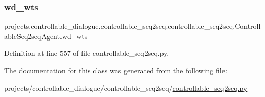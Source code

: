 \subsubsection{\texorpdfstring{wd\+\_\+wts}{wd\_wts}}
{\footnotesize\ttfamily projects.\+controllable\+\_\+dialogue.\+controllable\+\_\+seq2seq.\+controllable\+\_\+seq2seq.\+Controllable\+Seq2seq\+Agent.\+wd\+\_\+wts}



Definition at line 557 of file controllable\+\_\+seq2seq.\+py.



The documentation for this class was generated from the following file\+:\begin{DoxyCompactItemize}
\item 
projects/controllable\+\_\+dialogue/controllable\+\_\+seq2seq/\hyperlink{controllable__seq2seq_8py}{controllable\+\_\+seq2seq.\+py}\end{DoxyCompactItemize}

